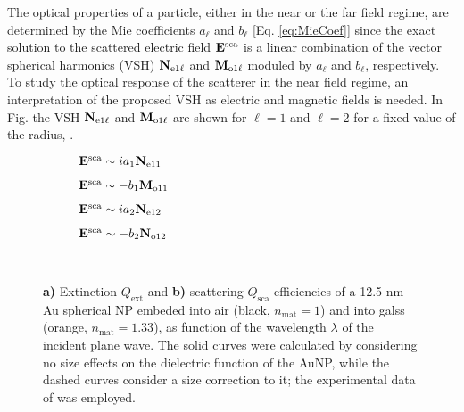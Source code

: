 
The optical properties of a particle, either in the near or the far field regime,  are determined by the Mie coefficients   $a_\ell$ and $b_\ell$ [Eq. \eqref{eq:MieCoef}] since the exact solution to the scattered electric field $\vb{E}^\text{sca}$ is a linear combination of the vector spherical harmonics (VSH) $\vb{N}_{\text{e}1\ell}$ and $\vb{M}_{\text{o}1\ell}$ moduled by  $a_\ell$ and $b_\ell$, respectively. To study the optical response of the scatterer in the near field regime, an interpretation of the proposed VSH as electric and magnetic fields is needed. In Fig. {} the VSH $\vb{N}_{\text{e}1\ell}$ and $\vb{M}_{\text{o}1\ell}$ are shown for $\ell = 1$ and $\ell = 2$ for a fixed value of the radius,  {}.

\begin{figure}[h!]
	\def\svgwidth{1\textwidth} \small
  \vspace*{3.0em}
  \hspace*{0.em}
  	\begin{subfigure}{.24\textwidth}\caption{ $\vb{E}^\text{sca} \sim  i a_1 \vb{N}_{\text{e}11}$}\label{fig:VSH:a1}\end{subfigure}
  	\begin{subfigure}{.24\textwidth}\caption{ $\vb{E}^\text{sca} \sim  - b_1 \vb{M}_{\text{o}11}$}\label{fig:VSH:b1}\end{subfigure}
	\begin{subfigure}{.24\textwidth}\caption{ $\vb{E}^\text{sca} \sim  i a_2 \vb{N}_{\text{e}12}$}\label{fig:VSH:a2}\end{subfigure}
	\begin{subfigure}{.24\textwidth}\caption{ $\vb{E}^\text{sca} \sim  - b_2 \vb{N}_{\text{o}12}$}\label{fig:VSH:b2}\end{subfigure}
  \vspace*{-6.em}\\
  \vspace*{-2em}
  \caption[Extinction and Scattering Efficency of a 12.5 nm Au Spherical NP embeded into Air and Glass]{ \textbf{a)} Extinction $Q_\text{ext}$ and \textbf{b)} scattering $Q_\text{sca}$ efficiencies of a 12.5 nm Au spherical NP embeded into air (black, $n_\text{mat} = 1$)  and into galss (orange, $n_\text{mat} = 1.33$), as function of the wavelength $\lambda$ of the incident plane wave.  The solid curves were calculated by considering no size effects on the dielectric function of the AuNP, while the dashed curves consider a size correction to it; the experimental data of \citeauthor{johnson_optical_1972} \cite{johnson_optical_1972} was employed.}
\label{fig:VSH}
\end{figure}



